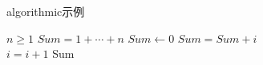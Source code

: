 \begin{algorithm}[!ht]
\caption{algorithmic示例}
\begin{algorithmic}[1] %
    \REQUIRE $n \geq 1$                  %
    \ENSURE $Sum = 1 + \cdots + n$       %
    \STATE $Sum \leftarrow 0$            %
    \ELSE
            \STATE $Sum = Sum + i$\\
            \STATE $i = i + 1$
        \ENDFOR
    \ENDIF
    \RETURN Sum
\end{algorithmic}
\end{algorithm}





